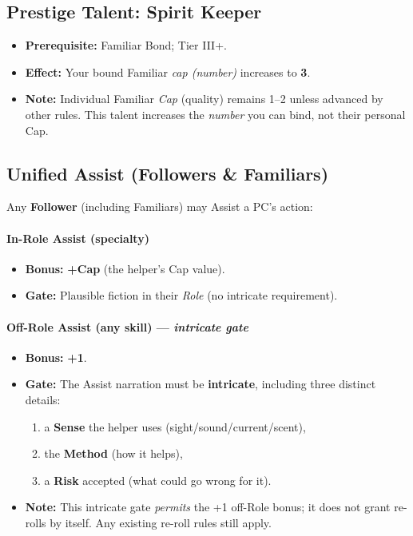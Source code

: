 \documentclass[12pt]{article}
\begin{document}
\subsection*{Prestige Talent: Spirit Keeper}
\begin{itemize}
  \item \textbf{Prerequisite:} Familiar Bond; Tier III+.
  \item \textbf{Effect:} Your bound Familiar \emph{cap (number)} increases to \textbf{3}.
  \item \textbf{Note:} Individual Familiar \emph{Cap} (quality) remains 1--2 unless advanced by other rules. This talent increases the \emph{number} you can bind, not their personal Cap.
\end{itemize}

\subsection*{Unified Assist (Followers \& Familiars)}
Any \textbf{Follower} (including Familiars) may Assist a PC’s action:

\paragraph{In-Role Assist (specialty)}
\begin{itemize}
  \item \textbf{Bonus:} \textbf{+Cap} (the helper’s Cap value).
  \item \textbf{Gate:} Plausible fiction in their \emph{Role} (no intricate requirement).
\end{itemize}

\paragraph{Off-Role Assist (any skill) --- \emph{intricate gate}}
\begin{itemize}
  \item \textbf{Bonus:} \textbf{+1}.
  \item \textbf{Gate:} The Assist narration must be \textbf{intricate}, including three distinct details:
  \begin{enumerate}
    \item a \textbf{Sense} the helper uses (sight/sound/current/scent),
    \item the \textbf{Method} (how it helps),
    \item a \textbf{Risk} accepted (what could go wrong for it).
  \end{enumerate}
  \item \textbf{Note:} This intricate gate \emph{permits} the +1 off-Role bonus; it does not grant re-rolls by itself. Any existing re-roll rules still apply.
\end{itemize}
\end{document}
